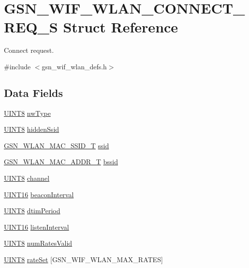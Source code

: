 \hypertarget{a00374}{
\section{GSN\_\-WIF\_\-WLAN\_\-CONNECT\_\-REQ\_\-S Struct Reference}
\label{a00374}
}


Connect request.  




{\ttfamily \#include $<$gsn\_\-wif\_\-wlan\_\-defs.h$>$}

\subsection*{Data Fields}
\begin{DoxyCompactItemize}
\item 
\hyperlink{a00660_gab27e9918b538ce9d8ca692479b375b6a}{UINT8} \hyperlink{a00374_aafc3f3af3f4d3ef964d5a573dc140bfa}{nwType}
\item 
\hyperlink{a00660_gab27e9918b538ce9d8ca692479b375b6a}{UINT8} \hyperlink{a00374_a382a496c170fb8bfac376161ed8d00e6}{hiddenSsid}
\item 
\hyperlink{a00417}{GSN\_\-WLAN\_\-MAC\_\-SSID\_\-T} \hyperlink{a00374_a9bcb2e5a0dbdd5461faec24950cf7459}{ssid}
\item 
\hyperlink{a00416}{GSN\_\-WLAN\_\-MAC\_\-ADDR\_\-T} \hyperlink{a00374_a1d70c2c8895c2763bdede85266c38318}{bssid}
\item 
\hyperlink{a00660_gab27e9918b538ce9d8ca692479b375b6a}{UINT8} \hyperlink{a00374_a52d69a3bd7bdfdfc6f9e40f4962c575d}{channel}
\item 
\hyperlink{a00660_ga09f1a1fb2293e33483cc8d44aefb1eb1}{UINT16} \hyperlink{a00374_a54a6c03695574d9381214937f9dc6d57}{beaconInterval}
\item 
\hyperlink{a00660_gab27e9918b538ce9d8ca692479b375b6a}{UINT8} \hyperlink{a00374_a299cd846e383cf8f77d0c2e71083caba}{dtimPeriod}
\item 
\hyperlink{a00660_ga09f1a1fb2293e33483cc8d44aefb1eb1}{UINT16} \hyperlink{a00374_a6429fe517dc48f11feaf8351ddf5c934}{listenInterval}
\item 
\hyperlink{a00660_gab27e9918b538ce9d8ca692479b375b6a}{UINT8} \hyperlink{a00374_a3c016113d244f6915211b9103557ac84}{numRatesValid}
\item 
\hyperlink{a00660_gab27e9918b538ce9d8ca692479b375b6a}{UINT8} \hyperlink{a00374_a67df6ac936e9a7862c722c4633410edc}{rateSet} \mbox{[}GSN\_\-WIF\_\-WLAN\_\-MAX\_\-RATES\mbox{]}

\end{DoxyCompactItemize}
